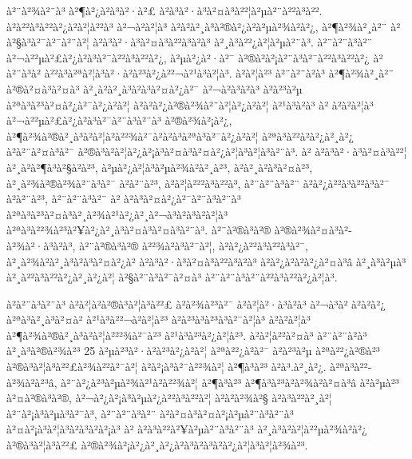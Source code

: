 à²¨à²¾à²¨à³ à²¶à²¿à²à³à²·à²£ à²à³à²·à³à²¤à³à²²¦à²µà²¨à²²à³à²². à²à²²à³à²²à²¿à²à²¦à²²à³ à²¬à²à²¦à³ à²à²à²¸à³à²®à²¿à²à²µà²¾à²à²¿, à²¶à²¾à²¸à²¨ à²à²§à³à²¯à²¯à²¨à²¦ à²à³à²·à³à²¤à³à²²à³à²à³ à²¸à³à²²¿à²¦à²µà²¨à³. à²¨à²¨à³à²¨ à²¬à²²µà²£à²¿à²à³à²¯à²²à³à²²à²¿, à²µà²¿à²·à²¯ à²®à²à²¡à²¨à³à²¯à²²à³à²²à²¿ à²à²¨à³à² à²²à³à²ªà²¦à³à²·à²à²³à²¿à²²¬à²¹à³à²¦à³. à²à²¦à²³ à²¨à²¨à²à³ à²¶à²¾à²¸à²¨ à²®à²¤à³à²¤à³ à²¸à²à²¸à³à²à³à²¤à²¿à²¯ à²¬à²à³à²à³ à²à²³à²µ à²ªà³à²³à²¤à²¿à²¯à²¿à²à²¦ à²à²­à²¿à²®à²¾à²¨à²¦à²¿à²à²¦ à²¹à³à²à³ à² à²à²à²¦à³ à²¬à²²µà²£à²¿à²à³à²¯à²¨à³à²¨à³ à²®à²¾à²¡à²¿, à²¶à²¾à²®à²¸à³à²à²¦à²\circ à²²¾à²¯à²\circ à²à³à²ªà³à²¯à²¿à²à²¦ à²ªà³à²²à²à²¿à²¸à²¿ à²à²¨à²¤à³à²¯ à²®à³à²à²¦à²¿à²¡à³à²¤à³à²¤à²¿à²¦à³à²¦à³à²¨à³. à² à²à³à²·à³à²¤à³à²²¦ à²¸à²à²¶à³à²§à²à²³, à²µà²¿à²¦à³à²µà²¾à²à²¸à²³, à²à²¸à²à³à²¤à²³, à²¸à²¾à²®à²¾à²¨à³à²¯ à²à²¨à²³, à²à²¦à²²²à³à²²à³, à²¨à²¨à³à²¨ à²à²¿à²²à³à²²à³à²¯ à²à²¨à²³, à²¨à²¨à³à²¨ à² à²à³à²¤à²¿à²¯à²¨à³à²¨à³ à²ªà³à²³à²¤à³à²¸à²¾à²¹à²¿à²¸à²¬à³à²à³à²à²¦à³ à²ªà³à²²¾à²³à²¥à²¿à²¸à³à²¤à³à²¤à³à²¨à³. à²¨à²®à³à²® à²®à²¾à²¤à³à²­à²¾à²·à³à²à³, à²¨à²®à³à²® à²²¾à²à³à²¯à²¦, à²à²¿à²²à³à²²à³à²¯, à²¸à²¾à²à²¸à³à²à³à²¤à²¿à² à²à³à²·à³à²¤à³à²²à³à²à³ à²à²¿à²à²à²¿à²¤à³â à²¸à³à²µà³ à²¸à²²à³à²²à²¿à²¸à²¿à²¦ à²§à²¨à³à²¯à²¤à³ à²¨à²¨à³à²¨à²²à³à²²à²¿à²¦à³.

à²à²¨à³à²¨à³ à²à²¦à²\circ à²®à³à²¦à³à²²£ à²à²¾à²³à²¯ à²à²¦à²·à³à²à³ à²¬à³à² à²à²à²¿ à²ªà³à²¸à³à²¤à² à²¹à³à²²¬à²à²¦à²³ à²à²³à³à²³à³à²¯à²¦à³ à²à²à²¦à³ à²¶à²¾à²®à²¸à³à²à²¦à²²²¾à²¯à²³ à²¹à³à²³à²¿à²¦à²³. à²à²¦à²²à²¤à³ à²¨à²¨à²à³ à²¸à³à²®à²¾à²³ 25 à²µà²³à²·à²à²³à²¿à²à²¦ à²ªà²²¿à²à²¯ à²à²³à²µ à²ªà²²¿à²®à²³ à²®à³à²¦à³à²²£à²¾à²²à²¯à²¦ à²à²¡à³à²¯à²²¾à²¦ à²¶à³à²³ à²à³.à²¸à²¿. à²ªà³à²²­à²¾à²à²³â, à²¨à²¿à²³à²µà²¾à²¹à²à²²¾à²¦ à²¶à³à²³ à²¶à³à²³à²à²¾à²à²¤à³â à²à²µà²³ à²¤à²®à³à²®, à²¬à²¿à²¡à³à²µà²¿à²²à³à²²à²¦ à²à²à²¾à²§ à²à³à²²à²¸à²¦ à²¨à²¡à³à²µà³à²¯à³, à²¨à²¨à³à²¨ à²à²¤à³à²¤à²¡à²µà²¨à³à²¨à³ à²¤à²¡à³à²¦à³à²à³à²à²¡à³ à² à²à³à²²à²¥à²µà²¨à³à²¨à³ à²¸à³à²à²¦à²²µà²¾à²à²¿ à²®à³à²¦à³à²²£ à²®à²¾à²¡à²¿à²¸à²¿à²à³à²à³à²à²¿à²¦à³à²¦à²¾à²³.

